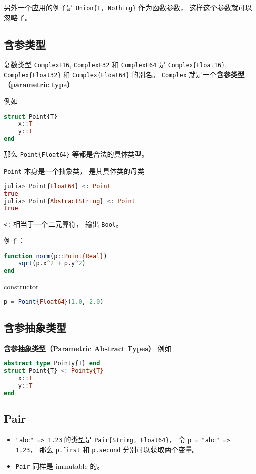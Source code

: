 另外一个应用的例子是 \verb|Union{T, Nothing}| 作为函数参数， 这样这个参数就可以忽略了。

\subsection{含参类型}

复数类型 \verb|ComplexF16|, \verb|ComplexF32| 和 \verb|ComplexF64| 是 \verb|Complex{Float16}|, \verb|Complex{Float32}| 和 \verb|Complex{Float64}| 的别名。 \verb|Complex| 就是一个\textbf{含参类型（parametric type）}

例如
\begin{lstlisting}[language=julia]
struct Point{T}
    x::T
    y::T
end
\end{lstlisting}
那么 \verb|Point{Float64}| 等都是合法的具体类型。

\verb|Point| 本身是一个抽象类， 是其具体类的母类
\begin{lstlisting}[language=julia]
julia> Point{Float64} <: Point
true
julia> Point{AbstractString} <: Point
true
\end{lstlisting}
\verb|<:| 相当于一个二元算符， 输出 \verb|Bool|。

例子：
\begin{lstlisting}[language=julia]
function norm(p::Point{Real})
    sqrt(p.x^2 + p.y^2)
end
\end{lstlisting}
constructor
\begin{lstlisting}[language=julia]
p = Point{Float64}(1.0, 2.0)
\end{lstlisting}

\subsection{含参抽象类型}
\textbf{含参抽象类型（Parametric Abstract Types）}
例如
\begin{lstlisting}[language=julia]
abstract type Pointy{T} end
struct Point{T} <: Pointy{T}
    x::T
    y::T
end
\end{lstlisting}

\subsection{Pair}
\begin{itemize}
\item \verb|"abc" => 1.23| 的类型是 \verb|Pair{String, Float64}|， 令 \verb|p = "abc" => 1.23|， 那么 \verb|p.first| 和 \verb|p.second| 分别可以获取两个变量。
\item \verb|Pair| 同样是 immutable 的。
\end{itemize}


